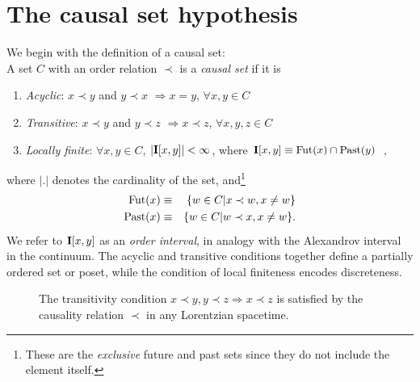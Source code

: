 \section{The causal set hypothesis}
\label{sec:cst} 

     
We begin with the definition of a causal set: \\

  A set $C$ with an order relation $\prec$ is a \emph{causal set}  if it is 
\begin{enumerate}  
\item \emph{Acyclic}: $x\prec y$ and $y \prec x $ $\Rightarrow x=y$, $\forall
  x,y \in C$ 
\item \emph{Transitive}: $x\prec y$ and $y \prec z $ $\Rightarrow x \prec z$, $\forall
  x,y,z \in C$ 
\item \emph{Locally finite}:  $\forall x,y \in C$, $|\mathbf I[x,y]|< \infty$, where $\mathbf I[x,y]\equiv \mathrm{Fut}(x) \cap \mathrm{Past}(y)$ \,,  
\end{enumerate} 
where $|.|$ denotes the cardinality of the set, and\footnote{These are  the \emph{exclusive} future and past sets since
  they do not include the element itself.} 
\begin{eqnarray}  
\mathrm{Fut}(x) &\equiv&\{w \in C| x \prec w, x \neq w\} \nonumber \\ 
  \mathrm{Past}(x) &\equiv&\{w \in C| w \prec x, x \neq w \}.
 \label{eq:futpast}                    
\end{eqnarray}
We refer to $\mathbf I[x,y]$ as an \emph{order interval}, in analogy with the  Alexandrov interval in the continuum. 
The acyclic and transitive conditions together define a partially
ordered set or poset, while the  condition of local finiteness
encodes discreteness.  
\begin{figure}[ht]
\centering {}
\caption{The transitivity condition $x \prec y, y \prec z \Rightarrow x\prec z$ is satisfied by the causality
    relation $\prec$ in any Lorentzian  spacetime.}
\label{transitive.fig}
\end{figure}




